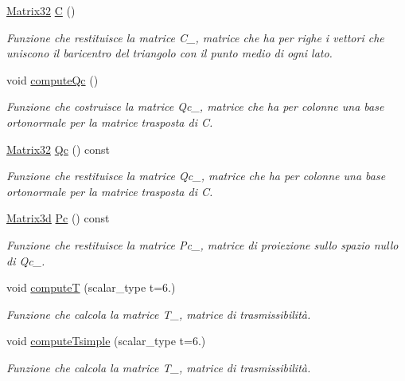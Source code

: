 \begin{DoxyCompactItemize}
\hyperlink{Core_8h_aee82131e398edee47a44d675ee802368}{Matrix32} \hyperlink{classMatrixBifurcationHandler_a4701fef8d864cb7d61521c8fbe5db2cc}{C} ()
\begin{DoxyCompactList}\small\item\em Funzione che restituisce la matrice C\-\_\-, matrice che ha per righe i vettori che uniscono il baricentro del triangolo con il punto medio di ogni lato. \end{DoxyCompactList}\item 
void \hyperlink{classMatrixBifurcationHandler_a203b6bfcdef418ffa927aebaeedc6da2}{compute\-Qc} ()
\begin{DoxyCompactList}\small\item\em Funzione che costruisce la matrice Qc\-\_\-, matrice che ha per colonne una base ortonormale per la matrice trasposta di C. \end{DoxyCompactList}\item 
\hyperlink{Core_8h_aee82131e398edee47a44d675ee802368}{Matrix32} \hyperlink{classMatrixBifurcationHandler_add50b813d3bd773ddf794c4e05b37e38}{Qc} () const 
\begin{DoxyCompactList}\small\item\em Funzione che restituisce la matrice Qc\-\_\-, matrice che ha per colonne una base ortonormale per la matrice trasposta di C. \end{DoxyCompactList}\item 
\hyperlink{Core_8h_acd816705c6602062b91975525c4e3f6f}{Matrix3d} \hyperlink{classMatrixBifurcationHandler_ad84675e9be6d56de69c0e25bf1cd77cd}{Pc} () const 
\begin{DoxyCompactList}\small\item\em Funzione che restituisce la matrice Pc\-\_\-, matrice di proiezione sullo spazio nullo di Qc\-\_\-. \end{DoxyCompactList}\item 
void \hyperlink{classMatrixBifurcationHandler_a46ee3c60eedda32abe36700ab2ce2d16}{compute\-T} (scalar\-\_\-type t=6.)
\begin{DoxyCompactList}\small\item\em Funzione che calcola la matrice T\-\_\-, matrice di trasmissibilità. \end{DoxyCompactList}\item 
void \hyperlink{classMatrixBifurcationHandler_a2153adb36bdbba82ca18ae74eb9e2ea7}{compute\-Tsimple} (scalar\-\_\-type t=6.)
\begin{DoxyCompactList}\small\item\em Funzione che calcola la matrice T\-\_\-, matrice di trasmissibilità. \end{DoxyCompactList}\item 

\end{DoxyCompactItemize}
